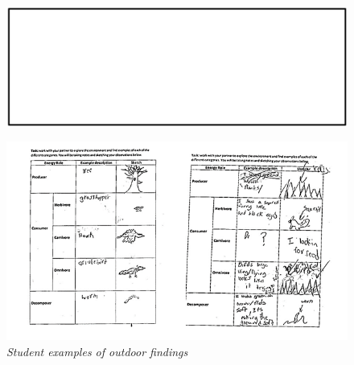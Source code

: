 \documentclass[11pt]{sig-alternate}
\begin{document}
\begin{large}
\begin{figure}[h!]
    \centering
    \label{Figure 3.6}
    \includegraphics[width=\columnwidth]{Box.PNG}
\end{figure}

\newpage
\begin{figure}[h!]
    \centering
    \captionsetup{font=large}
    \caption*{\textit{Student examples of outdoor findings}}
    \label{Figure 3.5}
    \includegraphics[width=\textwidth]{Figure 3e.png}
\end{figure}

\clearpage

\end{large}
\end{document}
